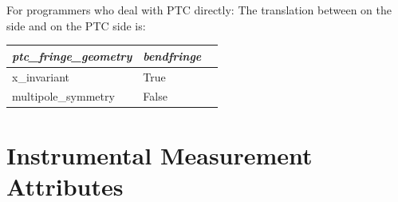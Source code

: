 For programmers who deal with PTC directly: The translation between
 on the \bmad side and  on the
PTC side is:

\begin{center}
\begin{tabular}{lll} \toprule 
{\em ptc_fringe_geometry} & {\em bendfringe} \\ \midrule
  x_invariant             & True  \\
  multipole_symmetry      & False \\ \bottomrule
\end{tabular}
\end{center}

\section{Instrumental Measurement Attributes}
\label{s:meas.attrib}



